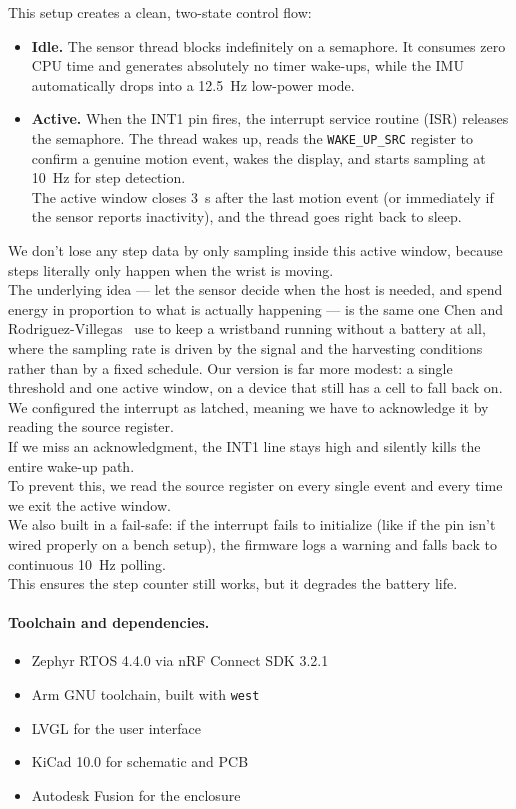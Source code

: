 \documentclass[12pt, a4paper]{article}
\begin{document}
This setup creates a clean, two-state control flow:

\begin{itemize}
  \item \textbf{Idle.} The sensor thread blocks indefinitely on a semaphore. It consumes zero CPU time and generates absolutely no timer wake-ups, while the IMU automatically drops into a \SI{12.5}{\hertz} low-power mode.

  \item \textbf{Active.} When the INT1 pin fires, the interrupt service routine (ISR) releases the semaphore. The thread wakes up, reads the \texttt{WAKE\_UP\_SRC} register to confirm a genuine motion event, wakes the display, and starts sampling at \SI{10}{\hertz} for step detection. \\
  The active window closes \SI{3}{\second} after the last motion event (or immediately if the sensor reports inactivity), and the thread goes right back to sleep.
\end{itemize}
%
We don't lose any step data by only sampling inside this active window, because steps literally only happen when the wrist is moving.\\
The underlying idea --- let the sensor decide when the host is needed, and spend
energy in proportion to what is actually happening --- is the same one Chen and
Rodriguez-Villegas~\cite{chen2025} use to keep a wristband running without a
battery at all, where the sampling rate is driven by the signal and the
harvesting conditions rather than by a fixed schedule. Our version is far more
modest: a single threshold and one active window, on a device that still has a
cell to fall back on.\\
We configured the interrupt as latched, meaning we have to acknowledge it by reading the source register. \\
If we miss an acknowledgment, the INT1 line stays high and silently kills the entire wake-up path. \\
To prevent this, we read the source register on every single event and every time we exit the active window. \\
We also built in a fail-safe: if the interrupt fails to initialize (like if the pin isn't wired properly on a bench setup), the firmware logs a warning and falls back to continuous \SI{10}{\hertz} polling. \\
This ensures the step counter still works, but it degrades the battery life.
%

\paragraph{Toolchain and dependencies.}
\begin{itemize}
  \item Zephyr RTOS 4.4.0 via nRF Connect SDK 3.2.1
  \item Arm GNU toolchain, built with \texttt{west}
  \item LVGL for the user interface
  \item KiCad 10.0 for schematic and PCB
  \item Autodesk Fusion for the enclosure
\end{itemize}
\end{document}
